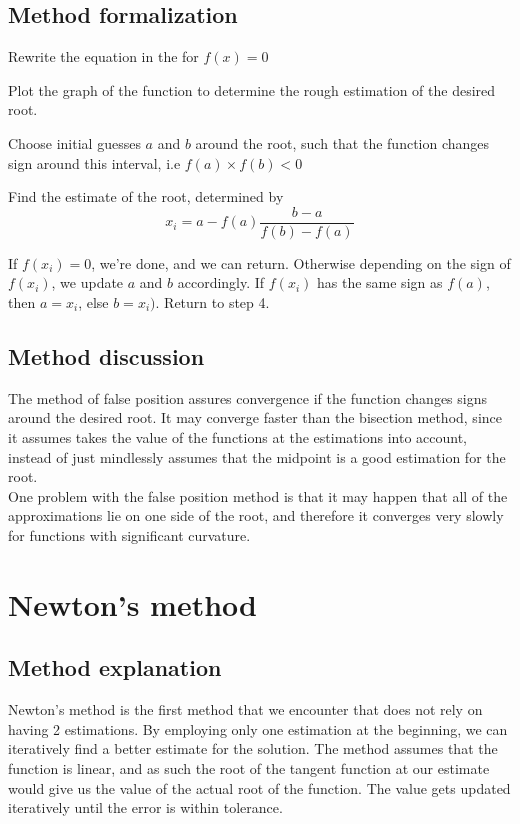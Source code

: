 \documentclass[openany]{book}
\begin{document}
    \subsection{Method formalization}
    \begin{steps}
    	\item Rewrite the equation in the for ${f(x) = 0}$
        \item Plot the graph of the function to determine the rough estimation of the desired root.
		\item Choose initial guesses ${a}$ and ${b}$ around the root, such that the function changes sign around this interval, i.e ${f(a) \times f(b)<0}$
        \item Find the estimate of the root, determined by 
        \[x_i = a - f(a)\frac{b - a}{f(b) - f(a)}\]
        \item If ${f(x_i) = 0}$, we're done, and we can return. Otherwise depending on the sign of ${f(x_i)}$, we update ${a}$ and ${b}$ accordingly. If ${f(x_i)}$ has the same sign as ${f(a)}$, then ${a = x_i}$, else ${b = x_i)}$. Return to step 4.
    \end{steps}
    \subsection{Method discussion}
    The method of false position assures convergence if the function changes signs around the desired root. It may converge faster than the bisection method, since it assumes takes the value of the functions at the estimations into account, instead of just mindlessly assumes that the midpoint is a good estimation for the root.\\
    One problem with the false position method is that it may happen that all of the approximations lie on one side of the root, and therefore it converges very slowly for functions with significant curvature.
    \section{Newton's method}
    \subsection{Method explanation}
    Newton's method is the first method that we encounter that does not rely on having 2 estimations. By employing only one estimation at the beginning, we can iteratively find a better estimate for the solution. The method assumes that the function is linear, and as such the root of the tangent function at our estimate would give us the value of the actual root of the function. The value gets updated iteratively until the error is within tolerance.
\end{document}
